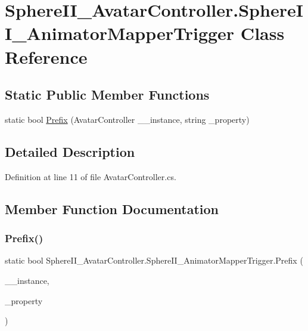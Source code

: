 \hypertarget{class_sphere_i_i___avatar_controller_1_1_sphere_i_i___animator_mapper_trigger}{}\section{Sphere\+I\+I\+\_\+\+Avatar\+Controller.\+Sphere\+I\+I\+\_\+\+Animator\+Mapper\+Trigger Class Reference}
\label{class_sphere_i_i___avatar_controller_1_1_sphere_i_i___animator_mapper_trigger}
\subsection*{Static Public Member Functions}
\begin{DoxyCompactItemize}
\item 
static bool \mbox{\hyperlink{class_sphere_i_i___avatar_controller_1_1_sphere_i_i___animator_mapper_trigger_aa80200d2e229d559a59d5fd81f309d61}{Prefix}} (Avatar\+Controller \+\_\+\+\_\+instance, string \+\_\+property)
\end{DoxyCompactItemize}


\subsection{Detailed Description}


Definition at line 11 of file Avatar\+Controller.\+cs.



\subsection{Member Function Documentation}
\mbox{\label{class_sphere_i_i___avatar_controller_1_1_sphere_i_i___animator_mapper_trigger_aa80200d2e229d559a59d5fd81f309d61}} 
\subsubsection{\texorpdfstring{Prefix()}{Prefix()}}
{\footnotesize\ttfamily static bool Sphere\+I\+I\+\_\+\+Avatar\+Controller.\+Sphere\+I\+I\+\_\+\+Animator\+Mapper\+Trigger.\+Prefix (\begin{DoxyParamCaption}\item[{Avatar\+Controller}]{\+\_\+\+\_\+instance,  }\item[{string}]{\+\_\+property }\end{DoxyParamCaption})\hspace{0.3cm}{\ttfamily [static]}}



